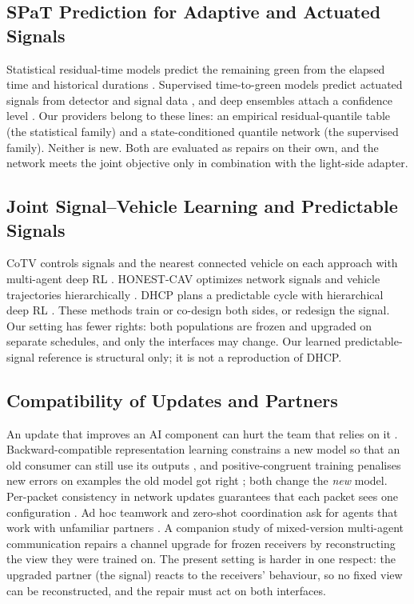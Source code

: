 \subsection{SPaT Prediction for Adaptive and Actuated Signals}
Statistical residual-time models predict the remaining green from the elapsed time and historical durations
\cite{bodenheimer2014,mahler2014}. Supervised time-to-green models predict actuated signals from detector and signal data
\cite{genser2024}, and deep ensembles attach a confidence level \cite{eteifa2025}. Our providers belong to these lines: an empirical
residual-quantile table (the statistical family) and a state-conditioned quantile network (the supervised family). Neither is new. Both are
evaluated as repairs on their own, and the network meets the joint objective only in combination with the light-side adapter.

\subsection{Joint Signal--Vehicle Learning and Predictable Signals}
CoTV controls signals and the nearest connected vehicle on each approach with multi-agent deep RL \cite{guo2023}. HONEST-CAV optimizes
network signals and vehicle trajectories hierarchically \cite{zhang2026}. DHCP plans a predictable cycle with hierarchical deep RL
\cite{gu2025}. These methods train or co-design both sides, or redesign the signal. Our setting has fewer rights: both populations are
frozen and upgraded on separate schedules, and only the interfaces may change. Our learned predictable-signal reference is structural
only; it is not a reproduction of DHCP.

\subsection{Compatibility of Updates and Partners}
An update that improves an AI component can hurt the team that relies on it \cite{bansal2019}. Backward-compatible representation
learning constrains a new model so that an old consumer can still use its outputs \cite{shen2020}, and positive-congruent training
penalises new errors on examples the old model got right \cite{yan2021}; both change the \emph{new} model. Per-packet consistency in
network updates guarantees that each packet sees one configuration \cite{reitblatt2012}. Ad hoc teamwork and zero-shot coordination ask
for agents that work with unfamiliar partners \cite{stone2010,hu2020}. A companion study of mixed-version multi-agent communication
\cite{nguyen2026legacy} repairs a channel upgrade for frozen receivers by reconstructing the view they were trained on. The present setting
is harder in one respect: the upgraded partner (the signal) reacts to the receivers' behaviour, so no fixed view can be reconstructed, and
the repair must act on both interfaces.

